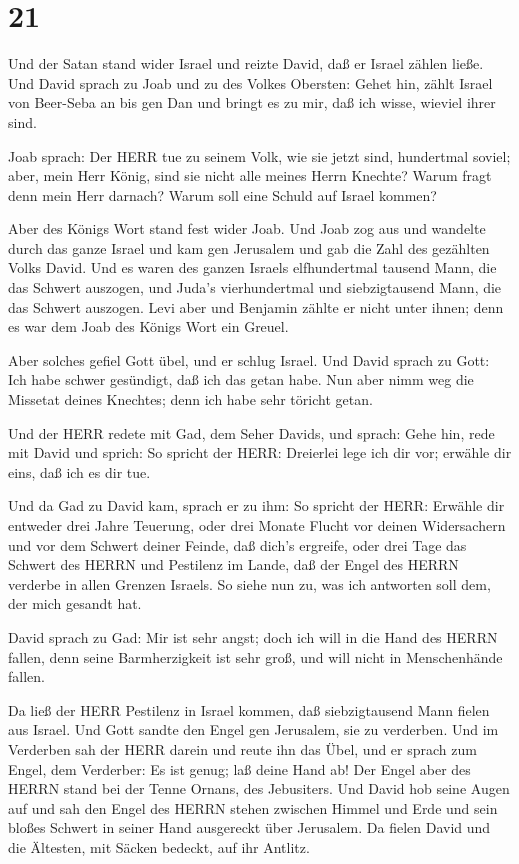 \hypertarget{section-20}{%
\section{21}\label{section-20}}

 Und der Satan stand wider Israel und reizte David, daß er
Israel zählen ließe.  Und David sprach zu Joab und zu des
Volkes Obersten: Gehet hin, zählt Israel von Beer-Seba an bis gen Dan
und bringt es zu mir, daß ich wisse, wieviel ihrer sind.

 Joab sprach: Der HERR tue zu seinem Volk, wie sie jetzt
sind, hundertmal soviel; aber, mein Herr König, sind sie nicht alle
meines Herrn Knechte? Warum fragt denn mein Herr darnach? Warum soll
eine Schuld auf Israel kommen?

 Aber des Königs Wort stand fest wider Joab. Und Joab zog
aus und wandelte durch das ganze Israel und kam gen Jerusalem
 und gab die Zahl des gezählten Volks David. Und es waren
des ganzen Israels elfhundertmal tausend Mann, die das Schwert auszogen,
und Juda's vierhundertmal und siebzigtausend Mann, die das Schwert
auszogen.  Levi aber und Benjamin zählte er nicht unter
ihnen; denn es war dem Joab des Königs Wort ein Greuel.

 Aber solches gefiel Gott übel, und er schlug Israel.
 Und David sprach zu Gott: Ich habe schwer gesündigt, daß
ich das getan habe. Nun aber nimm weg die Missetat deines Knechtes; denn
ich habe sehr töricht getan.

 Und der HERR redete mit Gad, dem Seher Davids, und sprach:
 Gehe hin, rede mit David und sprich: So spricht der HERR:
Dreierlei lege ich dir vor; erwähle dir eins, daß ich es dir tue.

 Und da Gad zu David kam, sprach er zu ihm: So spricht der
HERR: Erwähle dir  entweder drei Jahre Teuerung, oder drei
Monate Flucht vor deinen Widersachern und vor dem Schwert deiner Feinde,
daß dich's ergreife, oder drei Tage das Schwert des HERRN und Pestilenz
im Lande, daß der Engel des HERRN verderbe in allen Grenzen Israels. So
siehe nun zu, was ich antworten soll dem, der mich gesandt hat.

 David sprach zu Gad: Mir ist sehr angst; doch ich will in
die Hand des HERRN fallen, denn seine Barmherzigkeit ist sehr groß, und
will nicht in Menschenhände fallen.

 Da ließ der HERR Pestilenz in Israel kommen, daß
siebzigtausend Mann fielen aus Israel.  Und Gott sandte den
Engel gen Jerusalem, sie zu verderben. Und im Verderben sah der HERR
darein und reute ihn das Übel, und er sprach zum Engel, dem Verderber:
Es ist genug; laß deine Hand ab! Der Engel aber des HERRN stand bei der
Tenne Ornans, des Jebusiters.  Und David hob seine Augen
auf und sah den Engel des HERRN stehen zwischen Himmel und Erde und sein
bloßes Schwert in seiner Hand ausgereckt über Jerusalem. Da fielen David
und die Ältesten, mit Säcken bedeckt, auf ihr Antlitz.

